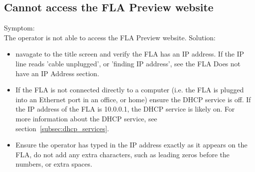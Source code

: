 \documentclass[11pt]{article}
\begin{document}
\subsection{Cannot access the FLA Preview website}
Symptom:\\
The operator is not able to access the FLA Preview website.
Solution:\\
\begin{itemize}
\item navagate to the title screen and verify the FLA has an IP address. If the IP line reads 'cable unplugged', or 'finding IP address', see the FLA Does not have an IP Address section.
\item If the FLA is not connected directly to a computer (i.e. the FLA is plugged into an Ethernet port in an office, or home) ensure the DHCP service is off. If the IP address of the FLA is 10.0.0.1, the DHCP service is likely on. For more information about the DHCP service, see section~\ref{subsec:dhcp_services}.
\item Ensure the operator has typed in the IP address exactly as it appears on the FLA, do not add any extra characters, such as leading zeros before the numbers, or extra spaces.
\end{itemize}
\end{document}
